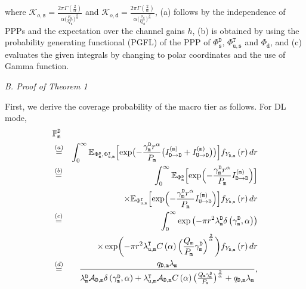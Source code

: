 \documentclass[twocolumn,english]{IEEEtran}
\theoremstyle{plain}
\theoremstyle{definition}
\begin{document}
where $\mathcal{K}_{o,\mathtt{s}}=\frac{2\pi\Gamma\left(\frac{2}{\alpha}\right)}{\alpha\bigl(\frac{\rho_{\mathtt{s}}}{Q_{\mathtt{d}}}\bigr)^{\frac{2}{\alpha}}}$
and $\mathcal{K}_{o,\mathtt{d}}=\frac{2\pi\Gamma\left(\frac{2}{\alpha}\right)}{\alpha\bigl(\frac{\rho_{\mathtt{d}}}{Q_{\mathtt{d}}}\bigr)^{\frac{2}{\alpha}}}$,
(a) follows by the independence of PPPs and the expectation over the
channel gains $h$, (b) is obtained by using the probability generating
functional (PGFL) of the PPP \cite{SGAI} of $\Phi_{\mathtt{s}}^{\mathtt{D}}$,
$\Phi_{\mathtt{u,s}}^{\mathtt{T}}$ and $\Phi_{\mathtt{d}}$, and
(c) evaluates the given integrals by changing to polar coordinates
and the use of Gamma function.

\emph{B. Proof of Theorem 1}

First, we derive the  coverage probability of the macro tier as follows.
For DL mode,
\begin{eqnarray}
 & \mathbb{P}_{\mathtt{m}}^{\mathtt{D}}\nonumber \\
 & \overset{(a)}{=} & \int_{0}^{\infty}\mathbb{E}_{\Phi_{\mathtt{m}}^{\mathtt{D}},\Phi_{\mathtt{u},\mathtt{m}}^{\mathtt{T}}}\Bigl[\exp\bigl(-\frac{\gamma_{\mathtt{m}}^{\mathtt{D}}r^{\alpha}}{P_{\mathtt{m}}}\bigl(I_{\mathtt{D\rightarrow D}}^{\mathtt{(m)}}+I_{\mathtt{U\rightarrow D}}^{\mathtt{(m)}}\bigr)\bigr)\Bigr]f_{Y_{\mathtt{D,m}}}\left(r\right)dr\nonumber \\
 & \overset{(b)}{=} & \int_{0}^{\infty}\mathbb{E}_{\Phi_{\mathtt{m}}^{\mathtt{D}}}\Bigl[\exp\Bigl(-\frac{\gamma_{\mathtt{m}}^{\mathtt{D}}r^{\alpha}}{P_{\mathtt{m}}}I_{\mathtt{D\rightarrow D}}^{\mathtt{(m)}}\Bigr)\Bigr]\nonumber \\
 &  & \times\mathbb{E}_{\Phi_{\mathtt{u,m}}^{\mathtt{T}}}\Bigl[\exp\Bigl(-\frac{\gamma_{\mathtt{m}}^{\mathtt{D}}r^{\alpha}}{P_{\mathtt{m}}}I_{\mathtt{U\rightarrow D}}^{\mathtt{(m)}}\Bigr)\Bigr]f_{Y_{\mathtt{D,m}}}\left(r\right)dr\nonumber \\
 & \overset{(c)}{=} & \int_{0}^{\infty}\exp\left(-\pi r^{2}\lambda_{\mathtt{m}}^{\mathtt{D}}\delta\left(\gamma_{\mathtt{m}}^{\mathtt{D}},\alpha\right)\right)\nonumber \\
 &  & \times\exp\biggl(-\pi r^{2}\lambda_{\mathtt{u,m}}^{\mathtt{T}}C\left(\alpha\right)\Bigl(\frac{Q_{\mathtt{m}}}{P_{\mathtt{m}}}\gamma_{\mathtt{m}}^{\mathtt{D}}\Bigr)^{^{\frac{2}{\alpha}}}\biggr)f_{Y_{\mathtt{D,m}}}\left(r\right)dr\nonumber \\
 & \overset{(d)}{=} & \frac{q_{\mathtt{D,m}}\lambda_{\mathtt{m}}}{\lambda_{\mathtt{m}}^{\mathtt{D}}\mathcal{A}_{\mathtt{D}\mathtt{,m}}\delta\left(\gamma_{\mathtt{m}}^{\mathtt{D}},\alpha\right)+\lambda_{\mathtt{u,m}}^{\mathtt{T}}\mathcal{A}_{\mathtt{D}\mathtt{,m}}C\left(\alpha\right)\bigl(\frac{Q_{\mathtt{m}}\gamma_{\mathtt{m}}^{\mathtt{D}}}{P_{\mathtt{m}}}\bigr)^{\frac{2}{\alpha}}+q_{\mathtt{D,m}}\lambda_{\mathtt{m}}},\nonumber \\
\label{eq:Cov_dm}
\end{eqnarray}
\end{document}

